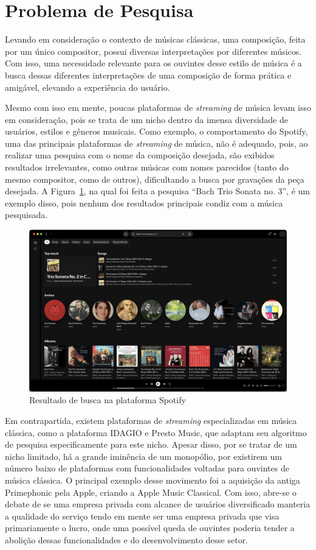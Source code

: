 \documentclass[12pt]{article}
\begin{document}
\section{Problema de Pesquisa} \label{sec:problem}

Levando em consideração o contexto de músicas clássicas, uma composição, feita
por um único compositor, possui diversas interpretações por diferentes músicos.
Com isso, uma necessidade relevante para os ouvintes desse estilo de música é a
busca dessas diferentes interpretações de uma composição de forma prática e
amigável, elevando a experiência do usuário.

Mesmo com isso em mente, poucas plataformas de \emph{streaming} de música levam
isso em consideração, pois se trata de um nicho dentro da imensa diversidade de
usuários, estilos e gêneros musicais.
Como exemplo, o comportamento do Spotify, uma das principais plataformas de
\emph{streaming} de música, não é adequado, pois, ao realizar uma pesquisa com o
nome da composição desejada, são exibidos resultados irrelevantes, como outras
músicas com nomes parecidos (tanto do mesmo compositor, como de outros), 
dificultando a busca por gravações da peça desejada.
A Figura~\ref{fig:spotify}, na qual foi feita a pesquisa ``Bach Trio Sonata no. 3'',
é um exemplo disso, pois nenhum dos resultados principais condiz com a música
pesquisada.

\begin{figure}[ht]
\centering
\includegraphics[width=1\textwidth]{figuras/Spotify.png}
\caption{Resultado de busca na plataforma Spotify}
\label{fig:spotify}
\end{figure}

Em contrapartida, existem plataformas de \emph{streaming} especializadas em
música clássica, como a plataforma IDAGIO e Presto Music, que adaptam seu
algoritmo de pesquisa especificamente para este nicho. Apesar disso, por se
tratar de um nicho limitado, há a grande iminência de um monopólio, por
existirem um número baixo de plataformas com funcionalidades voltadas para
ouvintes de música clássica. O principal exemplo desse movimento foi a aquisição
da antiga Primephonic pela Apple, criando a Apple Music Classical. Com isso,
abre-se o debate de se uma empresa privada com alcance de usuários diversificado
manteria a qualidade do serviço tendo em mente ser uma empresa privada que visa
primariamente o lucro, onde uma possível queda de ouvintes poderia tender a
abolição dessas funcionalidades e do desenvolvimento desse setor.
\end{document}
